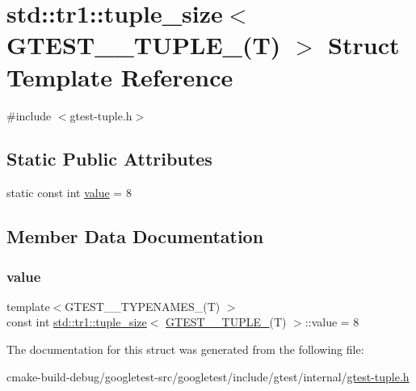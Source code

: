 \hypertarget{structstd_1_1tr1_1_1tuple__size_3_01GTEST__8__TUPLE___07T_08_01_4}{}\section{std\+::tr1\+::tuple\+\_\+size$<$ G\+T\+E\+S\+T\+\_\+\_\+\+T\+U\+P\+L\+E\+\_\+(T) $>$ Struct Template Reference}
\label{structstd_1_1tr1_1_1tuple__size_3_01GTEST__8__TUPLE___07T_08_01_4}


{\ttfamily \#include $<$gtest-\/tuple.\+h$>$}

\subsection*{Static Public Attributes}
\begin{DoxyCompactItemize}
\item 
static const int \mbox{\hyperlink{structstd_1_1tr1_1_1tuple__size_3_01GTEST__8__TUPLE___07T_08_01_4_a71abbf8156b1b110d3b8894ce02a44d8}{value}} = 8
\end{DoxyCompactItemize}


\subsection{Member Data Documentation}
\mbox{\label{structstd_1_1tr1_1_1tuple__size_3_01GTEST__8__TUPLE___07T_08_01_4_a71abbf8156b1b110d3b8894ce02a44d8}} 
\subsubsection{\texorpdfstring{value}{value}}
{\footnotesize\ttfamily template$<$G\+T\+E\+S\+T\+\_\+\_\+\+T\+Y\+P\+E\+N\+A\+M\+E\+S\+\_\+(\+T) $>$ \\
const int \mbox{\hyperlink{structstd_1_1tr1_1_1tuple__size}{std\+::tr1\+::tuple\+\_\+size}}$<$ \mbox{\hyperlink{namespacestd_1_1tr1_ab2b1c72e9db7436909d9ac011645f29d}{G\+T\+E\+S\+T\+\_\+\_\+\+T\+U\+P\+L\+E\+\_\+}}(T) $>$\+::value = 8\hspace{0.3cm}{\ttfamily [static]}}



The documentation for this struct was generated from the following file\+:\begin{DoxyCompactItemize}
\item 
cmake-\/build-\/debug/googletest-\/src/googletest/include/gtest/internal/\mbox{\hyperlink{gtest-tuple_8h}{gtest-\/tuple.\+h}}\end{DoxyCompactItemize}
